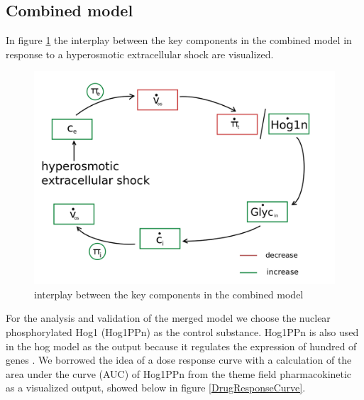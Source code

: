 \subsection{Combined model}
In figure \ref{Interplay} the interplay between the key components in the combined model in response to a hyperosmotic extracellular shock are visualized.
\begin{figure}[h!]
	\begin{center}
		\begin{minipage}{0,75\textwidth}
			
			\includegraphics[width=\textwidth]{picture/Interplay.png}
			\caption{interplay between the key components in the combined model} 
			\label{Interplay} 
		\end{minipage}
	\end{center}
\end{figure}
For the analysis and validation of the merged model we choose the nuclear phosphorylated Hog1 (Hog1PPn) as the control substance. Hog1PPn is also used in the hog model as the output because it regulates the expression of hundred of genes \cite{Zi_2010}. We borrowed the idea of a dose response curve with a calculation of the area under the curve (AUC) of Hog1PPn from the theme field pharmacokinetic as a visualized output, showed below in figure \ref{DrugResponseCurve}.  \newpage
